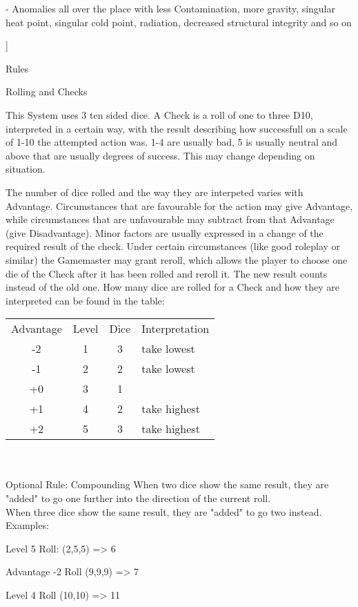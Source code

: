 \documentclass{article}
\newcommand{\headline}[1]{\begin{center}\Large #1 \normalsize \end{center}}
\newcommand{\subhline}[1]{\begin{center}\large #1 \normalsize \end{center}}
\begin{document}
    - Anomalies all over the place with less Contamination, more gravity, singular heat point, singular cold point, radiation, decreased structural integrity and so on\par
    ]
    \newpage
    \headline{Rules}
    \subhline{Rolling and Checks}

    This System uses 3 ten sided dice. A Check is a roll of one to three D10, interpreted
    in a certain way, with the result describing how successfull on a scale of 1-10 the attempted action was.
    1-4 are usually bad, 5 is usually neutral and above that are usually degrees of success.
    This may change depending on situation. \par
    The number of dice rolled and the way they are interpeted varies with Advantage.
    Circumstances that are favourable for the action may give Advantage, while circumstances
    that are unfavourable may subtract from that Advantage (give Disadvantage).
    Minor factors are usually expressed in a change of the required result of the check. Under certain circumstances (like
    good roleplay or similar) the Gamemaster may grant reroll, which allows the player to choose one die of the Check after
    it has been rolled and reroll it. The new result counts instead of the old one. \newline\newline
    How many dice are rolled for a Check and how they are interpreted can be found in the table:\par

    \begin{tabular}{c|c|c|l}
        Advantage & Level & Dice & Interpretation \\
        -2& 1& 3& take lowest\\
        \hline
        -1& 2& 2& take lowest\\
        \hline
        +0& 3& 1&\\
        \hline
        +1& 4& 2& take highest\\
        \hline
        +2& 5& 3& take highest\\
    \end{tabular}\\
    \vspace{2cm}\\
    Optional Rule: Compounding\newline
    When two dice show the same result, they are "added" to go one further into the direction of the current roll.\\
    When three dice show the same result, they are "added" to go two instead.\\
    Examples: \par
    Level 5 Roll: (2,5,5) => 6 \par
    Advantage -2 Roll (9,9,9) => 7 \par
    Level 4 Roll (10,10) => 11 \par
\end{document}

